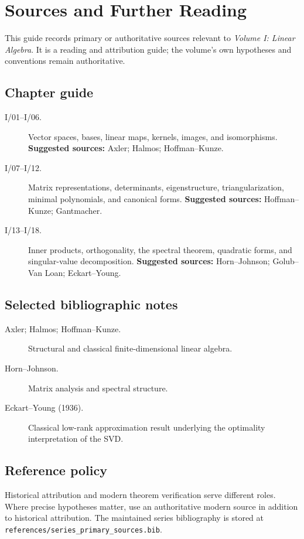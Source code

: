 \chapter*{Sources and Further Reading}
{}

This guide records primary or authoritative sources relevant to \emph{Volume I: Linear Algebra}.
It is a reading and attribution guide; the volume's own hypotheses and conventions remain authoritative.

\section*{Chapter guide}
\begin{description}
\item[I/01--I/06.] Vector spaces, bases, linear maps, kernels, images, and isomorphisms.
\textbf{Suggested sources:} Axler; Halmos; Hoffman--Kunze.

\item[I/07--I/12.] Matrix representations, determinants, eigenstructure, triangularization, minimal polynomials, and canonical forms.
\textbf{Suggested sources:} Hoffman--Kunze; Gantmacher.

\item[I/13--I/18.] Inner products, orthogonality, the spectral theorem, quadratic forms, and singular-value decomposition.
\textbf{Suggested sources:} Horn--Johnson; Golub--Van Loan; Eckart--Young.

\end{description}

\section*{Selected bibliographic notes}
\begin{description}
\item[Axler; Halmos; Hoffman--Kunze.] Structural and classical finite-dimensional linear algebra.

\item[Horn--Johnson.] Matrix analysis and spectral structure.

\item[Eckart--Young (1936).] Classical low-rank approximation result underlying the optimality interpretation of the SVD.

\end{description}

\section*{Reference policy}
Historical attribution and modern theorem verification serve different roles.
Where precise hypotheses matter, use an authoritative modern source in addition to historical attribution.
The maintained series bibliography is stored at \texttt{references/series\_primary\_sources.bib}.
